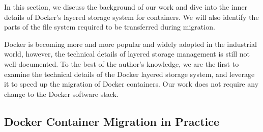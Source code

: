 
In this section, we discuss the background of our work and dive into the inner details of Docker's layered storage system for containers. We will also identify the parts of the file system required to be transferred during migration. 

Docker is becoming more and more popular and widely adopted in the industrial world, however, the technical details of layered storage management is still not well-documented. 
To the best of the author's knowledge, we are the first to examine the technical details of the Docker layered storage system, and leverage it to speed up the migration of Docker containers. Our work does not require any change to the Docker software stack.





\subsection{Docker Container Migration in Practice }\label{migpractice}




